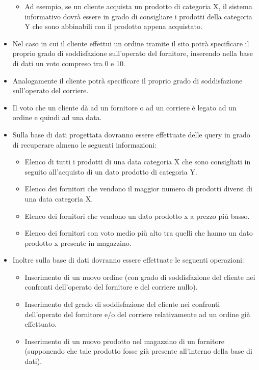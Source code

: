 \begin{itemize}
	\begin{itemize}
		\item Ad esempio, se un cliente acquista un prodotto di categoria X, il sistema informativo dovrà essere in grado di consigliare i prodotti della categoria Y che sono abbinabili con il prodotto appena acquistato.
	\end{itemize}
	\item Nel caso in cui il cliente effettui un ordine tramite il sito potrà specificare il proprio grado di soddisfazione sull’operato del fornitore, inserendo nella base di dati un voto compreso tra 0 e 10. 
	\item Analogamente il cliente potrà specificare il proprio grado di soddisfazione sull’operato del corriere.
	\item Il voto che un cliente dà ad un fornitore o ad un corriere è legato ad un ordine e quindi ad una data.
	\item Sulla base di dati progettata dovranno essere effettuate delle query in grado di recuperare almeno le seguenti informazioni:
	\begin{itemize}
		\item Elenco di tutti i prodotti di una data categoria X che sono consigliati in seguito all’acquisto di un dato prodotto di categoria Y.
		\item Elenco dei fornitori che vendono il maggior numero di prodotti diversi di una data categoria X.
		\item Elenco dei fornitori che vendono un dato prodotto x a prezzo più basso.
		\item Elenco dei fornitori con voto medio più alto tra quelli che hanno un dato prodotto x presente in magazzino.
	\end{itemize}
	\item Inoltre sulla base di dati dovranno essere effettuate le seguenti operazioni:
	\begin{itemize}
		\item Inserimento di un nuovo ordine (con grado di soddisfazione del cliente nei confronti dell’operato del fornitore e del corriere nullo).
		\item Inserimento del grado di soddisfazione del cliente nei confronti dell’operato del fornitore e/o del corriere relativamente ad un ordine già effettuato.
		\item Inserimento di un nuovo prodotto nel magazzino di un fornitore (supponendo che tale prodotto fosse già presente all’interno della base di dati).
	\end{itemize}
\end{itemize}
